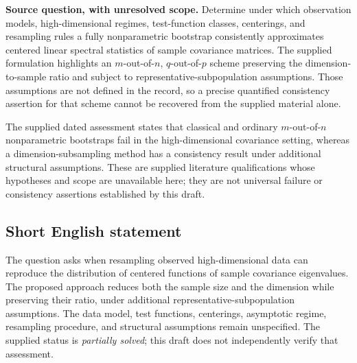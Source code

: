\documentclass[11pt]{article}
\begin{document}
\textbf{Source question, with unresolved scope.} Determine under which observation models, high-dimensional regimes, test-function classes, centerings, and resampling rules a fully nonparametric bootstrap consistently approximates centered linear spectral statistics of sample covariance matrices. The supplied formulation highlights an \(m\)-out-of-\(n\), \(q\)-out-of-\(p\) scheme preserving the dimension-to-sample ratio and subject to representative-subpopulation assumptions. Those assumptions are not defined in the record, so a precise quantified consistency assertion for that scheme cannot be recovered from the supplied material alone.

The supplied dated assessment states that classical and ordinary \(m\)-out-of-\(n\) nonparametric bootstraps fail in the high-dimensional covariance setting, whereas a dimension-subsampling method has a consistency result under additional structural assumptions. These are supplied literature qualifications whose hypotheses and scope are unavailable here; they are not universal failure or consistency assertions established by this draft.
\subsection{Short English statement}
The question asks when resampling observed high-dimensional data can reproduce the distribution of centered functions of sample covariance eigenvalues. The proposed approach reduces both the sample size and the dimension while preserving their ratio, under additional representative-subpopulation assumptions. The data model, test functions, centerings, asymptotic regime, resampling procedure, and structural assumptions remain unspecified. The supplied status is \emph{partially solved}; this draft does not independently verify that assessment.
\end{document}
